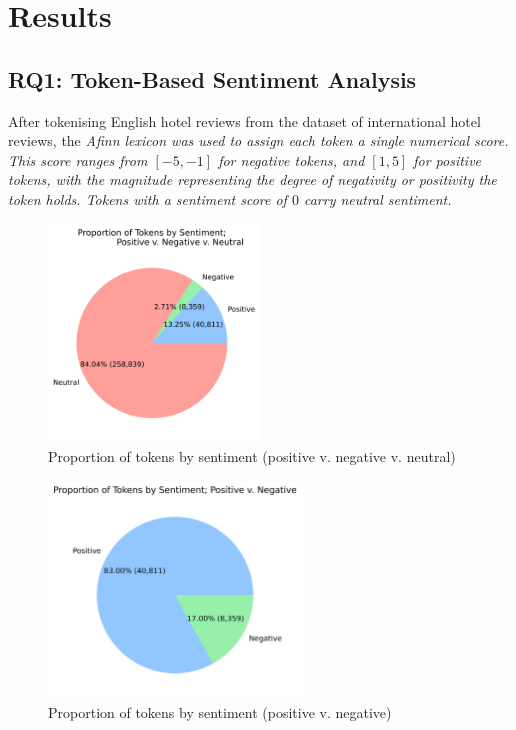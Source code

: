 \documentclass[12pt,bibliography=totocnumbered]{scrartcl}
\begin{document}
\section{Results}
\subsection{RQ1: Token-Based Sentiment Analysis}
After tokenising English hotel reviews from the dataset of international hotel reviews,
the \it{Afinn} lexicon was used to assign each token a single numerical score. This
score ranges from $[-5, -1]$ for negative tokens, and $[1, 5]$ for positive tokens,
with the magnitude representing the degree of negativity or positivity the token holds.
Tokens with a sentiment score of $0$ carry neutral sentiment.

\begin{figure}[htpb]
	\begin{center}
		\includegraphics[width=0.5\textwidth]{../results/rq1/pie_tripartite.png}
	\end{center}
	\caption{Proportion of tokens by sentiment (positive v. negative v. neutral)}
	\label{fig:reviews-pie1}
\end{figure}

\begin{figure}[htpb]
	\begin{center}
		\includegraphics[width=0.6\textwidth]{../results/rq1/pie_bipartite.png}
	\end{center}
	\caption{Proportion of tokens by sentiment (positive v. negative)}
	\label{fig:reviews-pie2}
\end{figure}
\end{document}
